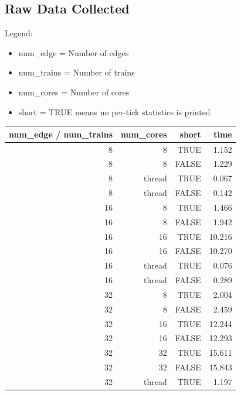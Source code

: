 \documentclass[a4paper,12pt]{article}
\begin{document}
\subsection{Raw Data Collected}
Legend:
\begin{itemize}
	\item num\_edge = Number of edges
	\item num\_trains = Number of trains
	\item num\_cores = Number of cores
	\item short = TRUE means no per-tick statistics is printed
\end{itemize}
\begin{center}
	\begin{tabular}{r r r | r}
		num\_edge / num\_trains & num\_cores & short & time    \\
		\hline
		8                       & 8          & TRUE  & 1.152   \\
		8                       & 8          & FALSE & 1.229   \\
		8                       & thread         & TRUE  & 0.067   \\
		8                       & thread         & FALSE & 0.142   \\
		\hline
		16                      & 8          & TRUE  & 1.466   \\
		16                      & 8          & FALSE & 1.942   \\
		16                      & 16         & TRUE  & 10.216  \\
		16                      & 16         & FALSE & 10.270  \\
		16                      & thread         & TRUE  & 0.076   \\
		16                      & thread         & FALSE & 0.289   \\
		\hline
		32                      & 8          & TRUE  & 2.004   \\
		32                      & 8          & FALSE & 2.459   \\
		32                      & 16         & TRUE  & 12.244  \\
		32                      & 16         & FALSE & 12.293  \\
		32                      & 32         & TRUE  & 15.611  \\
		32                      & 32         & FALSE & 15.843  \\
		32                      & thread         & TRUE  & 1.197   \\

\end{tabular}
\end{center}
\end{document}
